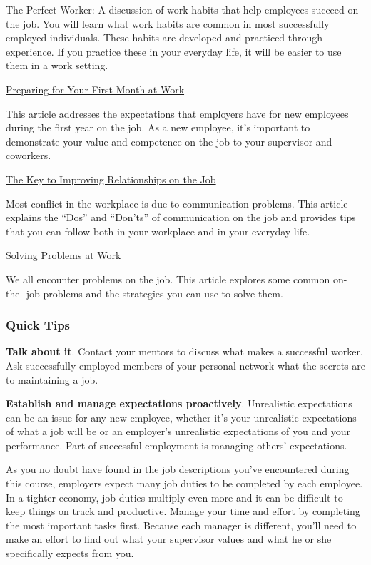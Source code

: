 The Perfect Worker: A discussion of work habits that help employees succeed on the job. You will learn what work habits are common in most successfully employed individuals. These habits are developed and practiced through experience. If you practice these in your everyday life, it will be easier to use them in a work setting.

\href{https://aphcareerconnect.org/succeed-at-work/succeeding-at-your-job/solving-problems-at-work/}{Preparing for Your First Month at Work}

This article addresses the expectations that employers have for new employees during the first year on the job. As a new employee, it's important to demonstrate your value and competence on the job to your supervisor and coworkers.

\href{https://aphcareerconnect.org/succeed-at-work/succeeding-at-your-job/solving-problems-at-work/}{The Key to Improving Relationships on the Job}

Most conflict in the workplace is due to communication problems. This article explains the ``Dos'' and ``Don'ts'' of communication on the job and provides tips that you can follow both in your workplace and in your everyday life.

\href{https://aphcareerconnect.org/succeed-at-work/succeeding-at-your-job/solving-problems-at-work/}{Solving Problems at Work}

We all encounter problems on the job. This article explores some common on- the- job-problems and the strategies you can use to solve them.

\subsubsection*{Quick Tips}
\textbf{Talk about it}. Contact your mentors to discuss what makes a successful worker. Ask successfully employed members of your personal network what the secrets are to maintaining a job.
 
\textbf{Establish and manage expectations proactively}. Unrealistic expectations can be an issue for any new employee, whether it's your unrealistic expectations of what a job will be or an employer's unrealistic expectations of you and your performance. Part of successful employment is managing others' expectations.

As you no doubt have found in the job descriptions you've encountered during this course, employers expect many job duties to be completed by each employee. In a tighter economy, job duties multiply even more and it can be difficult to keep things on track and productive. Manage your time and effort by completing the most important tasks first. Because each manager is different, you'll need to make an effort to find out what your supervisor values and what he or she specifically expects from you.

